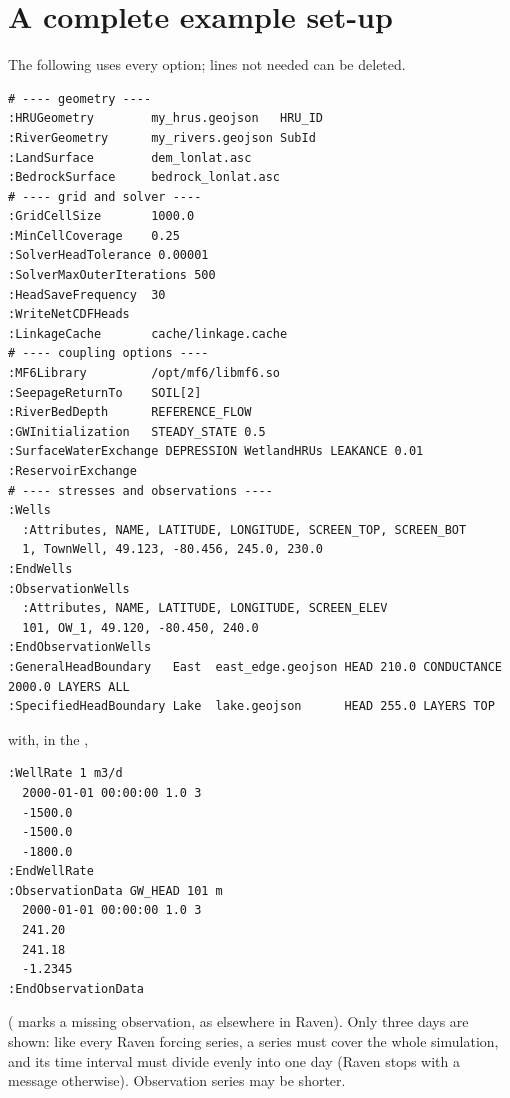 \section{A complete example set-up}
The following  uses every option; lines not needed can be deleted.
\begin{lstlisting}
# ---- geometry ----
:HRUGeometry        my_hrus.geojson   HRU_ID
:RiverGeometry      my_rivers.geojson SubId
:LandSurface        dem_lonlat.asc
:BedrockSurface     bedrock_lonlat.asc
# ---- grid and solver ----
:GridCellSize       1000.0
:MinCellCoverage    0.25
:SolverHeadTolerance 0.00001
:SolverMaxOuterIterations 500
:HeadSaveFrequency  30
:WriteNetCDFHeads
:LinkageCache       cache/linkage.cache
# ---- coupling options ----
:MF6Library         /opt/mf6/libmf6.so
:SeepageReturnTo    SOIL[2]
:RiverBedDepth      REFERENCE_FLOW
:GWInitialization   STEADY_STATE 0.5
:SurfaceWaterExchange DEPRESSION WetlandHRUs LEAKANCE 0.01
:ReservoirExchange
# ---- stresses and observations ----
:Wells
  :Attributes, NAME, LATITUDE, LONGITUDE, SCREEN_TOP, SCREEN_BOT
  1, TownWell, 49.123, -80.456, 245.0, 230.0
:EndWells
:ObservationWells
  :Attributes, NAME, LATITUDE, LONGITUDE, SCREEN_ELEV
  101, OW_1, 49.120, -80.450, 240.0
:EndObservationWells
:GeneralHeadBoundary   East  east_edge.geojson HEAD 210.0 CONDUCTANCE 2000.0 LAYERS ALL
:SpecifiedHeadBoundary Lake  lake.geojson      HEAD 255.0 LAYERS TOP
\end{lstlisting}
with, in the ,
\begin{lstlisting}
:WellRate 1 m3/d
  2000-01-01 00:00:00 1.0 3
  -1500.0
  -1500.0
  -1800.0
:EndWellRate
:ObservationData GW_HEAD 101 m
  2000-01-01 00:00:00 1.0 3
  241.20
  241.18
  -1.2345
:EndObservationData
\end{lstlisting}
( marks a missing observation, as elsewhere in Raven). Only three days are shown: like every Raven
forcing series, a  series must cover the whole simulation, and its time interval must divide evenly
into one day (Raven stops with a message otherwise). Observation series may be shorter.
